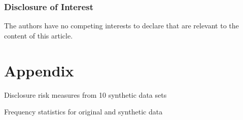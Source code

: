 \documentclass[runningheads]{llncs}
\begin{document}
\subsubsection{Disclosure of Interest} The authors have no competing interests to declare that are relevant to the content of this article.




\clearpage
\appendix
\section{Appendix}\label{appendix}
\setcounter{figure}{0}    
\setcounter{table}{0}    
\renewcommand*\thetable{\Alph{section}.\arabic{table}}
\renewcommand*\thefigure{\Alph{section}.\arabic{figure}}
\renewcommand{\theHfigure}{\Alph{section}.\arabic{table}}
\renewcommand{\theHtable}{\Alph{section}.\arabic{figure}}

\begin{table}[]
    \centering
    \caption{Disclosure risk measures from 10 synthetic data sets}
    
    \label{table:disclosure_risk_10}
\end{table}

\begin{table}[]
    \centering
    \caption{Frequency statistics for original and synthetic data}
    
    \label{table:frequency_10_data_sets}
\end{table}
\end{document}
